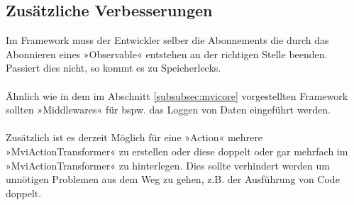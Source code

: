 \subsection{Zusätzliche Verbesserungen}
Im Framework muss der Entwickler selber die Abonnements die durch das Abonnieren eines »Observable« entstehen an der richtigen Stelle beenden. Passiert dies nicht, so kommt es zu Speicherlecks.
\\\\
Ähnlich wie in dem im Abschnitt
\ref{subsubsec:mvicore}
vorgestellten Framework sollten »Middlewares« für bspw. das Loggen von Daten eingeführt werden.
\\\\
Zusätzlich ist es derzeit Möglich für eine »Action« mehrere »MviActionTransformer« zu erstellen oder diese doppelt oder gar mehrfach im »MviActionTransformer« zu hinterlegen. Dies sollte verhindert werden um unnötigen Problemen aus dem Weg zu gehen, z.B. der Ausführung von Code doppelt.


